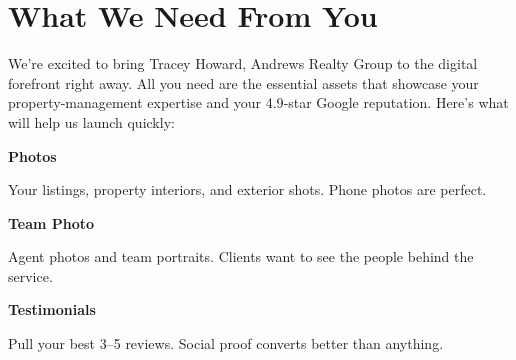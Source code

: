 \documentclass[11pt,letterpaper]{article}
\begin{document}
\vspace{0.2em}

\section*{What We Need From You}

We're excited to bring Tracey Howard, Andrews Realty Group to the digital forefront right away. All you need are the essential assets that showcase your property‑management expertise and your 4.9‑star Google reputation. Here’s what will help us launch quickly:

\vspace{0.12em}

\noindent\begin{minipage}[t]{0.48\textwidth}
\begin{tcolorbox}[colframe=accent-teal, boxrule=1pt, left=0.7em, right=0.7em, top=0.5em, bottom=0.5em, arc=4pt, boxsep=0pt]
{\bfseries\small\color{accent-teal}Photos}

\vspace{0.15em}

{\small Your listings, property interiors, and exterior shots. Phone photos are perfect.}
\end{tcolorbox}

\vspace{0.1em}

\begin{tcolorbox}[colframe=accent-teal, boxrule=1pt, left=0.7em, right=0.7em, top=0.5em, bottom=0.5em, arc=4pt, boxsep=0pt]
{\bfseries\small\color{accent-teal}Team Photo}

\vspace{0.15em}

{\small Agent photos and team portraits. Clients want to see the people behind the service.}
\end{tcolorbox}

\vspace{0.1em}

\begin{tcolorbox}[colframe=accent-teal, boxrule=1pt, left=0.7em, right=0.7em, top=0.5em, bottom=0.5em, arc=4pt, boxsep=0pt]
{\bfseries\small\color{accent-teal}Testimonials}

\vspace{0.15em}

{\small Pull your best 3–5 reviews. Social proof converts better than anything.}
\end{tcolorbox}
\end{minipage}
\end{document}
